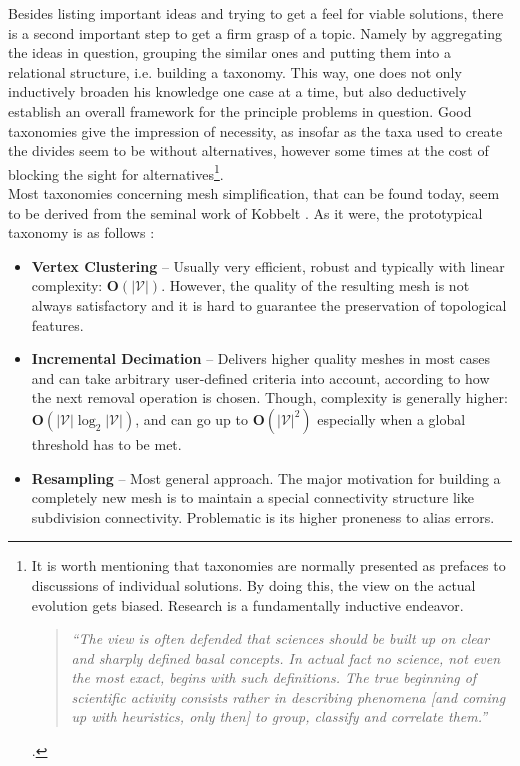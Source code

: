 Besides listing important ideas and trying to get a feel for viable solutions, there is a second important step to get a firm grasp of a topic.
Namely by aggregating the ideas in question, grouping the similar ones and putting them into a relational structure, i.e. building a taxonomy.
This way, one does not only inductively broaden his knowledge one case at a time, but also deductively establish an overall framework for the principle problems in question.
Good taxonomies give the impression of necessity, as insofar as the taxa used to create the divides seem to be without alternatives, however some times at the cost of blocking the sight for alternatives\footnote{ It is worth mentioning that taxonomies are normally presented as prefaces to discussions of individual solutions. By doing this, the view on the actual evolution gets biased. Research is a fundamentally inductive endeavor. \begin{quote} \textit{``The view is often defended that sciences should be built up on clear and sharply defined basal concepts. In actual fact no science, not even the most exact, begins with such definitions. The true beginning of scientific activity consists rather in describing phenomena [and coming up with heuristics, only then] to group, classify and correlate them.''} \citep[cf.][]{Freud1963} \end{quote}.}.\\
Most taxonomies concerning mesh simplification, that can be found today, seem to be derived from the seminal work of Kobbelt \citep[][cf. p.6]{Gotsman2002}.
As it were, the prototypical taxonomy is as follows \citep[][cf. p.11]{Shene2005}:
\begin{itemize}
  \setlength{\itemsep}{0cm}%
  \setlength{\parskip}{0cm}%
    \item \textbf{Vertex Clustering} -- Usually very efficient, robust and typically with linear complexity: $\mathbf{O}(|\mathcal{V}|)$. However, the quality of the resulting mesh is not always satisfactory and it is hard to guarantee the preservation of topological features.\\
    \item \textbf{Incremental Decimation} -- Delivers higher quality meshes in most cases and can take arbitrary user-defined criteria into account, according to how the next removal operation is chosen. Though, complexity is generally higher: $\mathbf{O}(|\mathcal{V}| \log_{2} |\mathcal{V}|)$, and can go up to $\mathbf{O}(|\mathcal{V}|^{2})$ especially when a global threshold has to be met.\\
    \item \textbf{Resampling} -- Most general approach. The major motivation for building a completely new mesh is to maintain a special connectivity structure like subdivision connectivity. Problematic is its higher proneness to alias errors.\\
\end{itemize}
